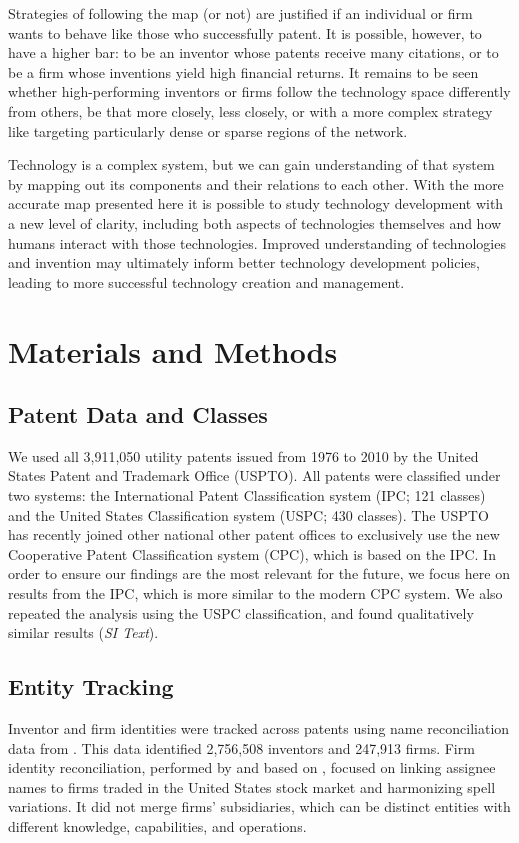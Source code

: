 \documentclass[pre,reprint,groupedaddress,superscriptaddress]{revtex4-1}
\begin{document}
Strategies of following the map (or not) are justified if an individual or firm wants to behave like those who successfully patent. It is possible, however, to have a higher bar: to be an inventor whose patents receive many citations, or to be a firm whose inventions yield high financial returns. It remains to be seen whether high-performing inventors or firms follow the technology space differently from others, be that more closely, less closely, or with a more complex strategy like targeting particularly dense or sparse regions of the network. 

Technology is a complex system, but we can gain understanding of that system by mapping out its components and their relations to each other. With the more accurate map presented here it is possible to study technology development with a new level of clarity, including both aspects of technologies themselves and how humans interact with those technologies. Improved understanding of technologies and invention may ultimately inform better technology development policies, leading to more successful technology creation and management.

\section{Materials and Methods}
\label{materialsandmethods}
\subsection{Patent Data and Classes}
We used all 3,911,050 utility patents issued from 1976 to 2010 by the United States Patent and Trademark Office (USPTO).
All patents were classified under two systems: the International Patent Classification system (IPC; 121 classes) and the United States Classification system (USPC; 430 classes). The USPTO has recently joined other national other patent offices to exclusively use the new Cooperative Patent Classification system (CPC), which is based on the IPC. In order to ensure our findings are the most relevant for the future, we focus here on results from the IPC, which is more similar to the modern CPC system. We also repeated the analysis using the USPC classification, and found qualitatively similar results (\textit{SI Text}).

\subsection{Entity Tracking}
Inventor and firm identities were tracked across patents using name reconciliation data from \cite{Li2014}. This data identified 2,756,508 inventors and 247,913 firms. Firm identity reconciliation, performed by \cite{Li2014} and based on \cite{Hall2001}, focused on linking assignee names to firms traded in the United States stock market and harmonizing spell variations. It did not merge firms' subsidiaries, which can be distinct entities with different knowledge, capabilities, and operations. 
\end{document}
